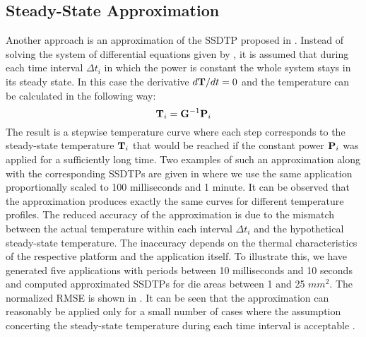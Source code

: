 \subsection{Steady-State Approximation}
Another approach is an approximation of the SSDTP proposed in \cite{huang2009}. Instead of solving the system of differential equations given by , it is assumed that during each time interval $\Delta t_i$ in which the power is constant the whole system stays in its steady state. In this case the derivative \mbox{$d\mathbf{T}/dt = 0$} and the temperature can be calculated in the following way:
\[
  \mathbf{T}_i = \mathbf{G}^{-1} \mathbf{P}_i
\]
The result is a stepwise temperature curve where each step corresponds to the steady-state temperature $\mathbf{T}_i$ that would be reached if the constant power $\mathbf{P}_i$ was applied for a sufficiently long time. Two examples of such an approximation along with the corresponding SSDTPs are given in  where we use the same application proportionally scaled to 100 milliseconds and 1 minute. It can be observed that the approximation produces exactly the same curves for different temperature profiles. The reduced accuracy of the approximation is due to the mismatch between the actual temperature within each interval $\Delta t_i$ and the hypothetical steady-state temperature. The inaccuracy depends on the thermal characteristics of the respective platform and the application itself. To illustrate this, we have generated five applications with periods between 10 milliseconds and 10 seconds and computed approximated SSDTPs for die areas between 1 and 25 $mm^2$. The normalized RMSE is shown in . It can be seen that the approximation can reasonably be applied only for a small number of cases where the assumption concerting the steady-state temperature during each time interval is acceptable \cite{huang2009}.
